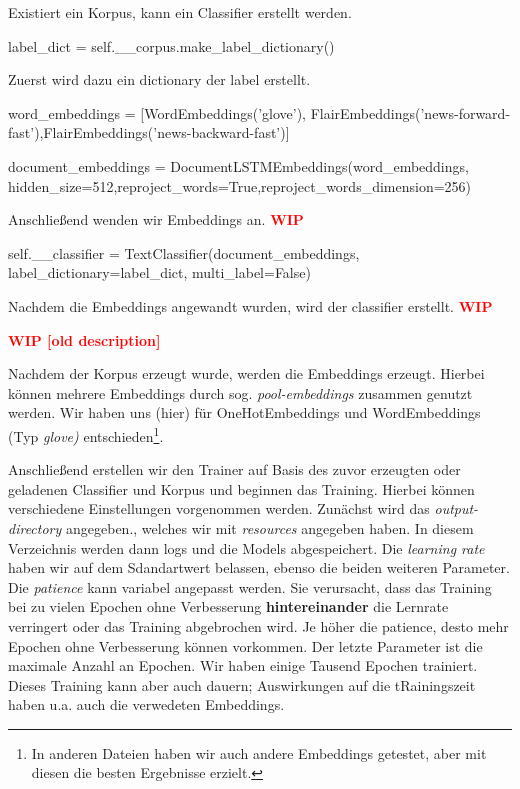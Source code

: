 \documentclass[10pt,a4paper]{article}
\begin{document}
\begin{flushleft}
Existiert ein Korpus, kann ein Classifier erstellt werden.

\begin{python}
label_dict = self.__corpus.make_label_dictionary()
\end{python}

Zuerst wird dazu ein dictionary der label erstellt.

\begin{python}
word_embeddings = [WordEmbeddings('glove'), FlairEmbeddings('news-forward-fast'),FlairEmbeddings('news-backward-fast')]

document_embeddings = DocumentLSTMEmbeddings(word_embeddings, hidden_size=512,reproject_words=True,reproject_words_dimension=256)
\end{python}

Anschließend wenden wir Embeddings an. \textbf{\textcolor{red}{WIP}}

\begin{python}
self.__classifier = TextClassifier(document_embeddings, label_dictionary=label_dict, multi_label=False)
\end{python}

Nachdem die Embeddings angewandt wurden, wird der classifier erstellt. \textbf{\textcolor{red}{WIP}}

\end{flushleft}



\begin{flushleft}

\textbf{\textcolor{red}{WIP [old description]}}

Nachdem der Korpus erzeugt wurde, werden die Embeddings erzeugt. Hierbei können mehrere Embeddings durch sog. \textit{pool-embeddings} zusammen genutzt werden. Wir haben uns (hier) für OneHotEmbeddings und WordEmbeddings (Typ \textit{glove)} entschieden\footnote{In anderen Dateien haben wir auch andere Embeddings getestet, aber mit diesen die besten Ergebnisse erzielt.}.

Anschließend erstellen wir den Trainer auf Basis des zuvor erzeugten oder geladenen Classifier und Korpus und beginnen das Training. Hierbei können verschiedene Einstellungen vorgenommen werden. Zunächst wird das \textit{output-directory} angegeben., welches wir mit \textit{resources} angegeben haben. In diesem Verzeichnis werden dann logs und die Models abgespeichert. Die \textit{learning rate} haben wir auf dem Sdandartwert belassen, ebenso die beiden weiteren Parameter. Die \textit{patience} kann variabel angepasst werden. Sie verursacht, dass das Training bei zu vielen Epochen ohne Verbesserung \textbf{hintereinander} die Lernrate verringert oder das Training abgebrochen wird. Je höher die patience, desto mehr Epochen ohne Verbesserung können vorkommen. Der letzte Parameter ist die maximale Anzahl an Epochen. Wir haben einige Tausend Epochen trainiert. Dieses Training kann aber auch dauern; Auswirkungen auf die tRainingszeit haben u.a. auch die verwedeten Embeddings.
\end{flushleft}
\end{document}
